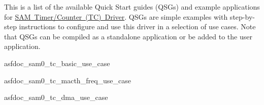 This is a list of the available Quick Start guides (Q\+S\+Gs) and example applications for \mbox{\hyperlink{group__asfdoc__sam0__tc__group}{S\+AM Timer/\+Counter (TC) Driver}}. Q\+S\+Gs are simple examples with step-\/by-\/step instructions to configure and use this driver in a selection of use cases. Note that Q\+S\+Gs can be compiled as a standalone application or be added to the user application.


\begin{DoxyItemize}
\item asfdoc\+\_\+sam0\+\_\+tc\+\_\+basic\+\_\+use\+\_\+case
\item asfdoc\+\_\+sam0\+\_\+tc\+\_\+macth\+\_\+freq\+\_\+use\+\_\+case
\item asfdoc\+\_\+sam0\+\_\+tc\+\_\+dma\+\_\+use\+\_\+case 
\end{DoxyItemize}